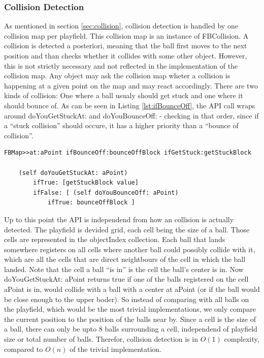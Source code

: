 \subsubsection{Collision Detection}
As mentioned in section
\ref{sec:collision}, 
collision detection is handled by one collision map per playfield. This collision
map is an instance of FBCollision. A collision is detected a posteriori, meaning
that the ball first moves to the next position and  than checks whether it collides
with some other object. However, this is not strictly necessary and not reflected in
the implementation of the collision map. Any object may ask the collision map wheter
a collision is happening at a given point on the map and may react accordingly. There
are two kinds of collision: One where a ball usualy should get stuck and one where it
should bounce of. As can be seen in Listing \ref{lst:ifBounceOff}, the API call wraps
around doYouGetStuckAt: and doYouBounceOff: - checking in that order, since if a ``stuck
collision'' should occure, it has a higher priority than a ``bounce of collision''.
%
\begin{lstlisting}[caption=API method for detecting collision,label=lst:ifBounceOff]
FBMap>>at:aPoint ifBounceOff:bounceOffBlock ifGetStuck:getStuckBlock
	
	(self doYouGetStuckAt: aPoint)
		ifTrue: [getStuckBlock value]
		ifFalse: [ (self doYouBounceOff: aPoint)
			ifTrue: bounceOffBlock ]
\end{lstlisting}
%
Up to this point the API is independend from how an collision is actually detected.
The playfield is devided grid, each cell being the size of a ball. Those cells are represented
in the objectIndex collection. Each ball that lands somewhere registers on all cells where
another ball could possibly collide with it, which are all the cells that are direct neightbours
of the cell in which the ball landed. Note that the cell a ball ``is in'' is the cell the ball's
center is in. Now doYouGetStuckAt: aPoint returns true if one of the balls registered on the
cell aPoint is in, would collide with a ball with a center at aPoint (or if the ball would be
close enough to the upper boder). So instead of comparing with all balls on the playfield, which
would be the most trivial implementations, we only compare the current position to the position
of the balls near by. Since a cell is the size of a ball, there can only be upto 8 balls surrounding
a cell, independend of playfield size or total number of balls. Therefor, collision detection is in
$O(1)$ complexity, compared to $O(n)$ of the trivial implementation.

